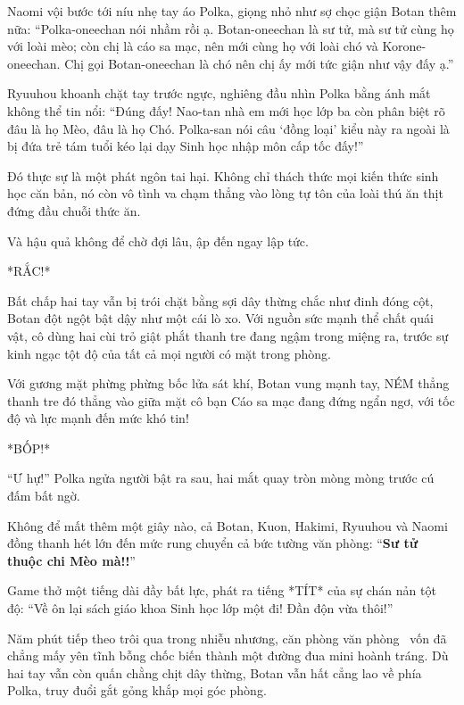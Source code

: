 \documentclass[../main.tex]{subfiles}
\begin{document}
Naomi vội bước tới níu nhẹ tay áo Polka, giọng nhỏ như sợ chọc giận Botan thêm nữa: ``Polka-oneechan nói nhầm rồi ạ. Botan-oneechan là sư tử, mà sư tử cùng họ với loài mèo; còn chị là cáo sa mạc, nên mới cùng họ với loài chó và Korone-oneechan. Chị gọi Botan-oneechan là chó nên chị ấy mới tức giận như vậy đấy ạ.''

Ryuuhou khoanh chặt tay trước ngực, nghiêng đầu nhìn Polka bằng ánh mắt không thể tin nổi: ``Đúng đấy! Nao-tan nhà em mới học lớp ba còn phân biệt rõ đâu là họ Mèo, đâu là họ Chó. Polka-san nói câu `đồng loại' kiểu này ra ngoài là bị đứa trẻ tám tuổi kéo lại dạy Sinh học nhập môn cấp tốc đấy!''

Đó thực sự là một phát ngôn tai hại. Không chỉ thách thức mọi kiến thức sinh học căn bản, nó còn vô tình va chạm thẳng vào lòng tự tôn của loài thú ăn thịt đứng đầu chuỗi thức ăn.

Và hậu quả không để chờ đợi lâu, ập đến ngay lập tức.

*RẮC!*

Bất chấp hai tay vẫn bị trói chặt bằng sợi dây thừng chắc như đinh đóng cột, Botan đột ngột bật dậy như một cái lò xo. Với nguồn sức mạnh thể chất quái vật, cô dùng hai cùi trỏ giật phắt thanh tre đang ngậm trong miệng ra, trước sự kinh ngạc tột độ của tất cả mọi người có mặt trong phòng.

Với gương mặt phừng phừng bốc lửa sát khí, Botan vung mạnh tay, NÉM thẳng thanh tre đó thẳng vào giữa mặt cô bạn Cáo sa mạc đang đứng ngẩn ngơ, với tốc độ và lực mạnh đến mức khó tin!

*BỐP!*

``Ư hự!'' Polka ngửa người bật ra sau, hai mắt quay tròn mòng mòng trước cú đấm bất ngờ.


Không để mất thêm một giây nào, cả Botan, Kuon, Hakimi, Ryuuhou và Naomi đồng thanh hét lớn đến mức rung chuyển cả bức tường văn phòng: ``\textbf{Sư tử thuộc chi Mèo mà!!}''

Game thở một tiếng dài đầy bất lực, phát ra tiếng *TÍT* của sự chán nản tột độ: ``Về ôn lại sách giáo khoa Sinh học lớp một đi! Đần độn vừa thôi!''

\omk

Năm phút tiếp theo trôi qua trong nhiễu nhương, căn phòng văn phòng \hll\ vốn đã chẳng mấy yên tĩnh bỗng chốc biến thành một đường đua mini hoành tráng. Dù hai tay vẫn còn quấn chằng chịt dây thừng, Botan vẫn hất cẳng lao về phía Polka, truy đuổi gắt gỏng khắp mọi góc phòng.
\end{document}

